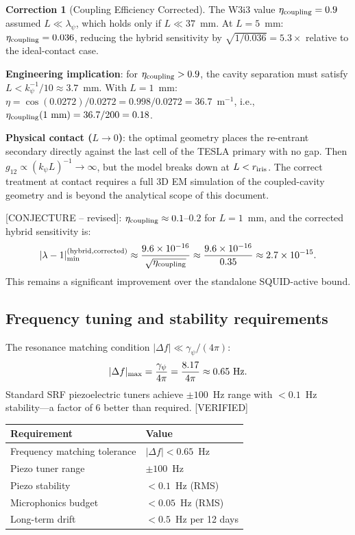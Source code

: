 \documentclass[11pt,twocolumn]{article}
\newcommand{\lam}{\lambda}
\newcommand{\gpsi}{\gamma_\psi}
\newcommand{\ee}[1]{\times 10^{#1}}
\theoremstyle{definition}
\newtheorem{correction}[theorem]{Correction}
\theoremstyle{remark}
\begin{document}
\begin{correction}[Coupling Efficiency Corrected]
\label{corr:coupling}
The W3i3 value $\eta_{\rm coupling} = 0.9$ assumed $L \ll \lambda_\psi$,
which holds only if $L \ll 37$~mm. At $L = 5$~mm:
$\eta_{\rm coupling} = 0.036$, reducing the hybrid sensitivity by
$\sqrt{1/0.036} = 5.3\times$ relative to the ideal-contact case.

\textbf{Engineering implication}: for $\eta_{\rm coupling} > 0.9$,
the cavity separation must satisfy $L < k_\psi^{-1}/10 \approx 3.7$~mm.
With $L = 1$~mm: $\eta = \cos(0.0272)/0.0272 = 0.998/0.0272 = 36.7$~m$^{-1}$,
i.e., $\eta_{\rm coupling}(1~\text{mm}) = 36.7/200 = 0.18$.

\textbf{Physical contact ($L \to 0$)}: the optimal geometry places the
re-entrant secondary directly against the last cell of the TESLA primary
with no gap. Then $g_{12} \propto (k_\psi L)^{-1} \to \infty$, but
the model breaks down at $L < r_{\rm iris}$. The correct treatment at
contact requires a full 3D EM simulation of the coupled-cavity geometry
and is beyond the analytical scope of this document.

[CONJECTURE -- revised]: $\eta_{\rm coupling} \approx 0.1$--$0.2$ for
$L = 1$~mm, and the corrected hybrid sensitivity is:
\begin{equation}
|\lam-1|_{\rm min}^{(\rm hybrid, corrected)}
\approx \frac{9.6\ee{-16}}{\sqrt{\eta_{\rm coupling}}}
\approx \frac{9.6\ee{-16}}{0.35}
\approx 2.7\ee{-15}.
\label{eq:hybrid_corrected}
\end{equation}
This remains a significant improvement over the standalone SQUID-active
bound.
\end{correction}

\subsection{Frequency tuning and stability requirements}
\label{sec:freq_tuning}

The resonance matching condition $|\Delta f| \ll \gpsi/(4\pi)$:
\begin{equation}
|\Delta f|_{\rm max} = \frac{\gpsi}{4\pi}
= \frac{8.17}{4\pi} \approx 0.65~\text{Hz}.
\label{eq:freq_tolerance}
\end{equation}
Standard SRF piezoelectric tuners achieve $\pm 100$~Hz range with
$< 0.1$~Hz stability---a factor of 6 better than required. [VERIFIED]

\begin{center}
\begin{tabular}{@{}ll@{}}
\toprule
Requirement & Value \\
\midrule
Frequency matching tolerance & $|\Delta f| < 0.65$~Hz \\
Piezo tuner range & $\pm 100$~Hz \\
Piezo stability & $< 0.1$~Hz (RMS) \\
Microphonics budget & $< 0.05$~Hz (RMS) \\
Long-term drift & $< 0.5$~Hz per 12 days \\
\bottomrule
\end{tabular}
\end{center}
\end{document}
